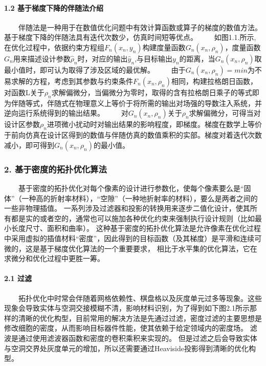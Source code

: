 \documentclass[a4paper,10pt,english]{sphinxmanual}
\begin{document}
\paragraph{1.2 基于梯度下降的伴随法介绍}
\label{\detokenize{_u7b80_u4ecb/_u6838_u5fc3_u8bbe_u8ba1_u4f18_u5316_u7b97_u6cd5/_u68af_u5ea6_u62d3_u6251_u4f18_u5316_u6a21_u5757/_u68af_u5ea6_u62d3_u6251_u4f18_u5316_u7b97_u6cd5:id4}}
\sphinxAtStartPar
  伴随法是一种用于在数值优化问题中有效计算函数或算子的梯度的数值方法。基于梯度下降的伴随法具有迭代次数少，仿真时间短等优点。
  如图1.1.所示,在优化过程中，依据约束方程组\(F_n(x_n,y_n)\)构建度量函数\(G_n(x_n,ρ_n)\)，度量函数\(G_n\)用来描述设计参数\(\hat{ρ}_n\)时，对应的输出\(\hat{y}_n\),与目标输出\(y_n\)的距离，当\(G_n(x_n,ρ_n)\)取最小值时，即可认为取得了涉及区域的最优解。
  由于\(G_n(x_n,ρ_n)=min\)为不易求解的方程，考虑到其参数与约束条件\(F_n(x_n,ρ_n)\)相同，构建拉格朗日函数，对函数L关于\(ρ_n\)求解偏微分，当偏微分为零时，取得的含有拉格朗日乘子的等式即为伴随等式，伴随式在物理意义上等价于将所需的输出对场强的导数注入系统，并逆向运行系统得到的输出结果。
  对\(G_n(x_n,ρ_n)\)关于\(ρ_n\)求解偏微分，可得当对设计区参数\(ρ_n\)进项微小扰动时对输出结果的影响程度，即梯度。梯度在数学上等价于前向仿真在设计区得到的数值与伴随仿真的数值乘积的实部。梯度对着迭代次数减小，即可得到\(G_n(x_n,ρ_n)\)的最小值。







\subsubsection{2. 基于密度的拓扑优化算法}
\label{\detokenize{_u7b80_u4ecb/_u6838_u5fc3_u8bbe_u8ba1_u4f18_u5316_u7b97_u6cd5/_u68af_u5ea6_u62d3_u6251_u4f18_u5316_u6a21_u5757/_u68af_u5ea6_u62d3_u6251_u4f18_u5316_u7b97_u6cd5:id5}}
\sphinxAtStartPar
  基于密度的拓扑优化对每个像素的设计进行参数化，使每个像素要么是“固体”（一种高的折射率材料），“空隙”（一种地折射率的材料），要么是两者之间的一些非物理插值。
一系列涉及过滤器和投影的转换用来逐步二值化设计，使其所有都是实的或者空的，通常也可以施加各种优化约束来强制执行设计规则（比如最小长度尺寸、面积和曲率）。
这种基于密度的拓扑优化算法是允许像素在优化过程中采用虚拟的插值材料“密度”，因此得到的目标函数（及其梯度）是平滑和连续可微的，这是基于梯度优化算法的一个重要要求，
相比于水平集的优化算法，它在求微分和优化过程中更胜一筹。


\paragraph{2.1 过滤}
\label{\detokenize{_u7b80_u4ecb/_u6838_u5fc3_u8bbe_u8ba1_u4f18_u5316_u7b97_u6cd5/_u68af_u5ea6_u62d3_u6251_u4f18_u5316_u6a21_u5757/_u68af_u5ea6_u62d3_u6251_u4f18_u5316_u7b97_u6cd5:id6}}
\sphinxAtStartPar
  拓扑优化中时常会伴随着网格依赖性、棋盘格以及灰度单元过多等现象。这些现象会导致实体与空洞交接模糊不清，影响材料识别，为了得到如下图2.1所示那样的清晰的优化构型，目前常用的解决方法是先通过过滤，密度过滤的主要思想是修改细胞的密度，从而影响目标器件性能，使其依赖于给定领域内的密度场。
滤波是通过使用滤波器函数和密度的卷积乘积来实现的。
但是过滤之后会导致实体与空洞交界处灰度单元的增加，所以还需要通过Heaviside投影得到清晰的优化构型。
\end{document}
